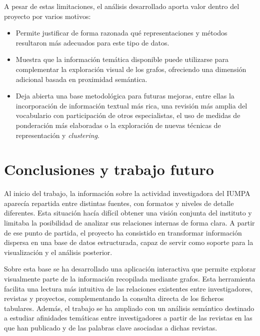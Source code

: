 \documentclass[11pt,spanish,listoffigures,listoftables]{tfgetsinf}
\begin{document}
A pesar de estas limitaciones, el análisis desarrollado aporta valor dentro del proyecto por varios motivos:

\begin{itemize}
    \item Permite justificar de forma razonada qué representaciones y métodos resultaron más adecuados para este tipo de datos.
    
    \item Muestra que la información temática disponible puede utilizarse para complementar la exploración visual de los grafos, ofreciendo una dimensión adicional basada en proximidad semántica.
    
    \item Deja abierta una base metodológica para futuras mejoras, entre ellas la incorporación de información textual más rica, una revisión más amplia del vocabulario con participación de otros especialistas, el uso de medidas de ponderación más elaboradas o la exploración de nuevas técnicas de representación y \textit{clustering}.
\end{itemize}



\chapter{Conclusiones y trabajo futuro}

Al inicio del trabajo, la información sobre la actividad investigadora del IUMPA aparecía repartida entre distintas fuentes, con formatos y niveles de detalle diferentes. Esta situación hacía difícil obtener una visión conjunta del instituto y limitaba la posibilidad de analizar sus relaciones internas de forma clara. A partir de ese punto de partida, el proyecto ha consistido en transformar información dispersa en una base de datos estructurada, capaz de servir como soporte para la visualización y el análisis posterior.

Sobre esta base se ha desarrollado una aplicación interactiva que permite explorar visualmente parte de la información recopilada mediante grafos. Esta herramienta facilita una lectura más intuitiva de las relaciones existentes entre investigadores, revistas y proyectos, complementando la consulta directa de los ficheros tabulares. Además, el trabajo se ha ampliado con un análisis semántico destinado a estudiar afinidades temáticas entre investigadores a partir de las revistas en las que han publicado y de las palabras clave asociadas a dichas revistas.
\end{document}
